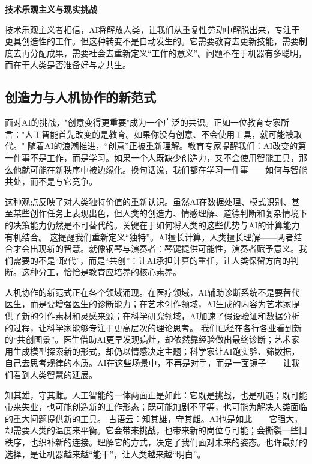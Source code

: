{\bf 技术乐观主义与现实挑战}

技术乐观主义者相信，AI将解放人类，让我们从重复性劳动中解脱出来，专注于更具创造性的工作。但这种转变不是自动发生的。它需要教育去更新技能，需要制度去再分配成果，需要社会去重新定义“工作的意义”。问题不在于机器有多聪明，而在于人类是否准备好与之共生。


\subsection{创造力与人机协作的新范式}

面对AI的挑战，"创意变得更重要"成为一个广泛的共识。正如一位教育专家所言："人工智能首先改变的是教育。如果你没有创意、不会使用工具，就可能被取代。"
随着AI的浪潮推进，“创意”正被重新理解。教育专家提醒我们：AI改变的第一件事不是工作，而是学习。如果一个人既缺少创造力，又不会使用智能工具，那么他就可能在新秩序中被边缘化。换句话说，我们都在学习一件事——如何与智能共处，而不是与它竞争。

这种观点反映了对人类独特价值的重新认识。虽然AI在数据处理、模式识别、甚至某些创作任务上表现出色，但人类的创造力、情感理解、道德判断和复杂情境下的决策能力仍然是不可替代的。关键在于如何将人类的这些优势与AI的计算能力有机结合。
这提醒我们重新定义“独特”。AI擅长计算，人类擅长理解——两者结合才会出现新的智慧。就像钢琴与演奏者：琴键提供可能性，演奏者赋予意义。我们需要的不是“取代”，而是“共创”：让AI承担计算的重任，让人类保留方向的判断。这种分工，恰恰是教育应培养的核心素养。

人机协作的新范式正在各个领域涌现。在医疗领域，AI辅助诊断系统不是要替代医生，而是要增强医生的诊断能力；在艺术创作领域，AI生成的内容为艺术家提供了新的创作素材和灵感来源；在科学研究领域，AI加速了假设验证和数据分析的过程，让科学家能够专注于更高层次的理论思考。
我们已经在各行各业看到新的“共创图景”。医生借助AI更早发现病灶，却依然靠经验做出最终诊断；艺术家用生成模型探索新的形式，却仍以情感决定主题；科学家让AI跑实验、筛数据，自己去思考规律的本质。AI在这些场景中，不再是对手，而是一面镜子——让我们看到人类智慧的延展。

知其雄，守其雌。人工智能的一体两面正是如此：它既是挑战，也是机遇；既可能带来失业，也可能创造新的工作形态；既可能加剧不平等，也可能为解决人类面临的重大问题提供新的工具。
古语云：知其雄，守其雌。AI也是如此——它强大，却需要人类的温度来平衡。它会带来挑战，也带来新的岗位与可能；会撕裂一些旧秩序，也织补新的连接。理解它的方式，决定了我们面对未来的姿态。也许最好的选择，是让机器越来越“能干”，让人类越来越“明白”。

